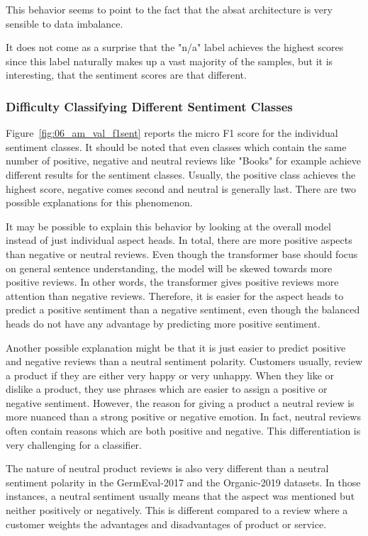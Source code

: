 This behavior seems to point to the fact that the \gls{absat} architecture is very sensible to data imbalance.


It does not come as a surprise that the "n/a" label achieves the highest scores since this label naturally makes up a vast majority of the samples, but it is interesting, that the sentiment scores are that different.

\subsubsection*{Difficulty Classifying Different Sentiment Classes}

Figure~\ref{fig:06_am_val_f1sent} reports the micro F1 score for the individual sentiment classes. It should be noted that even classes which contain the same number of positive, negative and neutral reviews like "Books" for example achieve different results for the sentiment classes. Usually, the positive class achieves the highest score, negative comes second and neutral is generally last. There are two possible explanations for this phenomenon.
\smallskip

It may be possible to explain this behavior by looking at the overall model instead of just individual aspect heads. In total, there are more positive aspects than negative or neutral reviews. Even though the transformer base should focus on general sentence understanding, the model will be skewed towards more positive reviews. In other words, the transformer gives positive reviews more attention than negative reviews. Therefore, it is easier for the aspect heads to predict a positive sentiment than a negative sentiment, even though the balanced heads do not have any advantage by predicting more positive sentiment.
\bigskip

Another possible explanation might be that it is just easier to predict positive and negative reviews than a neutral sentiment polarity. Customers usually, review a product if they are either very happy or very unhappy. When they like or dislike a product, they use phrases which are easier to assign a positive or negative sentiment. However, the reason for giving a product a neutral review is more nuanced than a strong positive or negative emotion. In fact, neutral reviews often contain reasons which are both positive and negative. This differentiation is very challenging for a classifier. 
\smallskip

The nature of neutral product reviews is also very different than a neutral sentiment polarity in the GermEval-2017 and the Organic-2019 datasets. In those instances, a neutral sentiment usually means that the aspect was mentioned but neither positively or negatively. This is different compared to a review where a customer weights the advantages and disadvantages of product or service.

